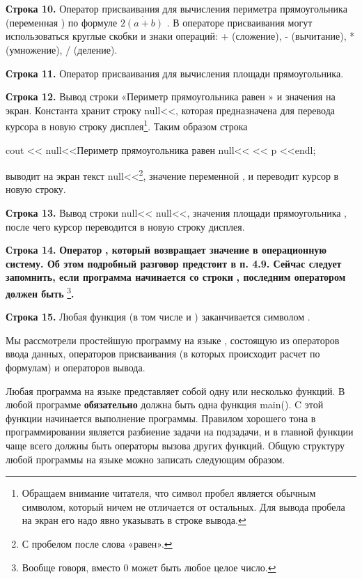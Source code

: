 \textbf{Строка 10.} Оператор присваивания для вычисления периметра прямоугольника (переменная ) по
формуле  $2\dot{(a+b)}$ . В операторе присваивания могут использоваться круглые скобки и знаки операций: + (сложение),
- (вычитание), * (умножение), / (деление).

\textbf{Строка 11.} Оператор присваивания для вычисления площади прямоугольника.

\textbf{Строка 12.} Вывод строки «Периметр прямоугольника равен » и значения  на экран. Константа
 хранит строку null{<<}, которая предназначена для
перевода курсора в новую строку дисплея\footnote{Обращаем внимание читателя, что символ пробел является обычным
символом, который ничем не отличается от остальных. Для вывода пробела на экран его надо явно указывать в строке
вывода.}. Таким образом строка 

cout {\textless}{\textless} null{<<}Периметр прямоугольника равен null{<<} {\textless}{\textless} p
{\textless}{\textless}endl; 

выводит на экран текст null{<<}\footnote{С пробелом после слова
«равен».}, значение переменной , и переводит курсор в новую строку.

\textbf{Строка 13.} Вывод строки null{<<} null{<<}, значения площади
прямоугольника , после чего курсор переводится в новую строку дисплея.

\textbf{Строка 14.}\textbf{\textmd{ Оператор }}\textbf{\textmd{, который возвращает значение в
операционную систему. Об этом подробный разговор предстоит в п. 4.9. Сейчас следует запомнить, если программа
начинается со строки }}\textbf{\textmd{, последним оператором должен быть
}}\footnote{Вообще говоря, вместо 0 может быть любое целое число.}\textbf{\textmd{.}}

\textbf{Строка 15.} Любая функция (в том числе и ) заканчивается символом \textstyleExample{\}}.

Мы рассмотрели простейшую программу на языке , состоящую из операторов ввода данных, операторов присваивания (в
которых происходит расчет по формулам) и операторов вывода. 

Любая программа на языке  представляет собой одну или несколько функций. В любой программе \textbf{обязательно}
должна быть одна функция main(). C этой функции начинается выполнение программы. Правилом хорошего
тона в программировании является разбиение задачи на подзадачи, и в главной функции чаще всего должны быть операторы
вызова других функций. Общую структуру любой программы на языке  можно записать следующим
образом. 

